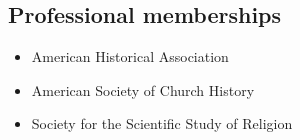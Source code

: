 \documentclass[11pt]{article}
\providecommand{\tightlist}{%
  \setlength{\itemsep}{0pt}\setlength{\parskip}{0pt}}
\begin{document}


\subsection{Professional memberships}\label{Memberships}

\begin{itemize}
    \tightlist
    \item American Historical Association
    \item American Society of Church History
    \item Society for the Scientific Study of Religion
\end{itemize}
\end{document}
